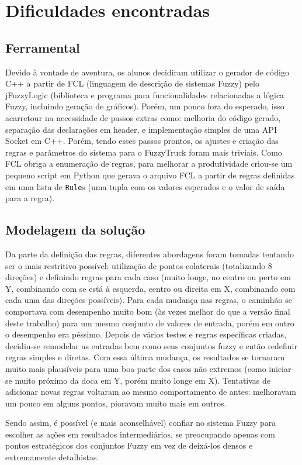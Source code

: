 \documentclass[twocolumn]{article}
\begin{document}
    \section{Dificuldades encontradas}

    \subsection{Ferramental}

    Devido à vontade de aventura, os alunos decidiram utilizar o gerador de
    código C++ a partir de FCL (linguagem de descrição de sistemas Fuzzy) pelo
    jFuzzyLogic (biblioteca e programa para funcionalidades relacionadas a
    lógica Fuzzy, incluindo geração de gráficos). Porém, um pouco fora do
    esperado, isso acarretour na necessidade de passos extras como: melhoria do
    código gerado, separação das declarações em header, e implementação simples
    de uma API Socket em C++. Porém, tendo esses passos prontos, os ajustes e
    criação das regras e parâmetros do sistema para o FuzzyTruck foram mais
    triviais. Como FCL obriga a enumeração de regras, para melhorar a
    produtividade criou-se um pequeno script em Python que gerava o arquivo FCL
    a partir de regras definidas em uma lista de \texttt{Rule}s (uma tupla com
    os valores esperados e o valor de saída para a regra).

    \subsection{Modelagem da solução}

    Da parte da definição das regras, diferentes abordagens foram tomadas
    tentando ser o mais restritivo possível: utilização de pontos colaterais
    (totalizando 8 direções) e definindo regras para cada caso (muito longe, no
    centro ou perto em Y, combinando com se está à esquerda, centro ou direita
    em X, combinando com cada uma das direções possíveis). Para cada mudança
    nas regras, o caminhão se comportava com desempenho muito bom (às vezes
    melhor do que a versão final deste trabalho) para um mesmo conjunto de
    valores de entrada, porém em outro o desempenho era péssimo. Depois de
    vários testes e regras específicas criadas, decidiu-se remodelar as
    entradas bem como seus conjuntos fuzzy e então redefinir regras simples e
    diretas. Com essa última mudança, os resultados se tornaram muito mais
    plausíveis para uma boa parte dos casos não extremos (como iniciar-se muito
    próximo da doca em Y, porém muito longe em X). Tentativas de adicionar
    novas regras voltaram ao mesmo comportamento de antes: melhoravam um pouco
    em alguns pontos, pioravam muito mais em outros.

    Sendo assim, é possível (e mais aconselhável) confiar no sistema Fuzzy para
    escolher as ações em resultados intermediários, se preocupando apenas com
    pontos estratégicos dos conjuntos Fuzzy em vez de deixá-los densos e
    extremamente detalhistas.

    
    
    \nocite{*}
\end{document}
